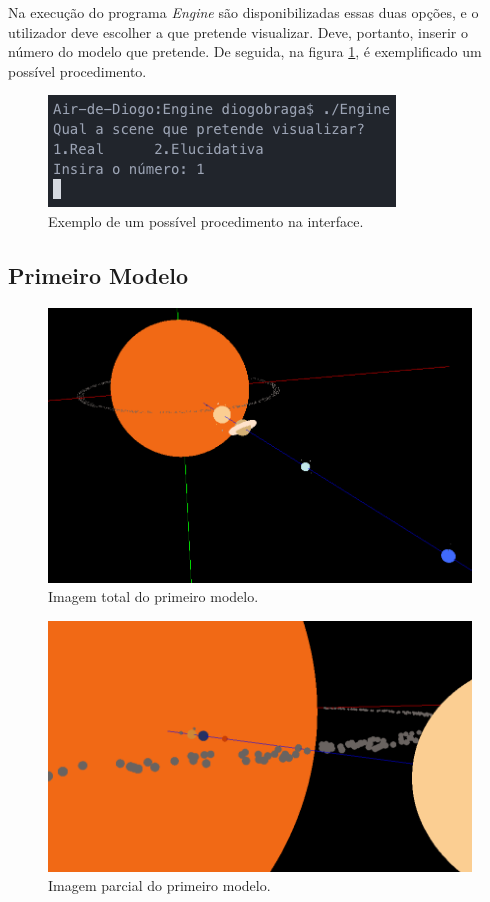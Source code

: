 \documentclass[a4paper]{article}
\begin{document}
Na execução do programa \textit{Engine} são disponibilizadas essas duas opções, e o utilizador deve escolher a que pretende visualizar. Deve, portanto, inserir o número do modelo que pretende. De seguida, na figura \ref{img:interface}, é exemplificado um possível procedimento.

\begin{figure}[H]
\centering
\includegraphics[scale=0.5]{interface.png}
\caption{Exemplo de um possível procedimento na interface.}
\label{img:interface}
\end{figure}


\newpage

\subsection{Primeiro Modelo}

\begin{figure}[H]
\centering
\includegraphics[scale=0.4]{modelo1_1.png}
\caption{Imagem total do primeiro modelo.}
\label{img:modelo1_1}
\end{figure}

\begin{figure}[H]
\centering
\includegraphics[scale=0.4]{modelo1_2.png}
\caption{Imagem parcial do primeiro modelo.}
\label{img:modelo1_2}
\end{figure}
\end{document}
